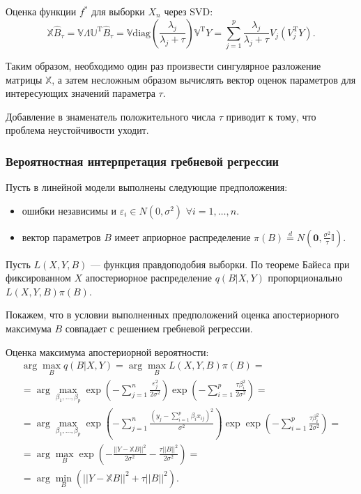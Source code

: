 \documentclass[11pt,colorlinks=true]{article}
\DeclareMathOperator{\T}{T}
\begin{document}
 Оценка функции $f^{\ast}$ для выборки $X_{n}$ через SVD:
\begin{equation*}
\mathbb{X}\hat{B}_{\tau} = \mathbb{V}\mathbb{\Lambda}\mathbb{U}^{\T}\hat{B}_{\tau} = \mathbb{V} \mathrm{diag}\left(\frac{\lambda_j}{\lambda_j + \tau}\right)\mathbb{V}^{\T}Y = \sum_{j=1}^p \frac{\lambda_j}{\lambda_j + \tau} V_j(V_j^{\T}Y).
\end{equation*}

 Таким образом, необходимо один раз произвести сингулярное разложение матрицы $\mathbb{X}$, а затем несложным образом вычислять вектор оценок параметров для интересующих значений параметра $\tau$. 

Добавление в знаменатель положительного числа $\tau$ приводит к тому, что проблема неустойчивости уходит. 

\subsubsection{Вероятностная интерпретация гребневой регрессии}

Пусть в линейной модели выполнены следующие предположения:
\begin{itemize}
\item ошибки независимы и $\varepsilon_{i}\in N(0,\sigma^{2})$ $\forall i=1,\ldots,n$.
\item вектор параметров $B$ имеет априорное распределение $\pi(B)\stackrel{d}{=}N(\bm{0},\frac{\sigma^{2}}{\tau}\mathbb{I})$.
\end{itemize}

 Пусть $L(X,Y,B)$ --- функция правдоподобия выборки. 
 По теореме Байеса при фиксированном $X$ апостериорное распределение $q(B|X,Y)$ пропорционально $L(X,Y,B)\pi(B)$.

Покажем, что в условии выполненных предположений оценка апостериорного максимума $B$ совпадает с решением гребневой регрессии.

Оценка максимума апостериорной вероятности:
\begin{multline*}
\arg\max_{B}q(B|X,Y)
=
\arg\max_{B}L(X,Y,B)\pi(B)
=\\=
\arg\max_{\beta_{1},\ldots,\beta_{p}}\exp
\left(
-\sum_{j=1}^{n}
\frac{\varepsilon_{j}^{2}}{2\sigma^{2}}
\right)
\exp\left(
-\sum_{i=1}^{p}
\frac{\tau\beta_{i}^{2}}{2\sigma^{2}}\right)
=\\=
\arg\max_{\beta_{1},\ldots,\beta_{p}}\exp
\left(-\sum_{j=1}^{n}
\frac{(y_{j}-\sum_{i=1}^{p}\beta_{i}x_{ij})^{2}}{\sigma^{2}}
\right)
\exp
\exp\left(
-\sum_{i=1}^{p}
\frac{\tau\beta_{i}^{2}}{2\sigma^{2}}\right)
=\\=
\arg\max_{B}
\exp
\left(
-\frac{||Y-\mathbb{X}B||^{2}}{2\sigma^{2}}-\frac{\tau||B||^{2}}{2\sigma^{2}}
\right)
=\\=
\arg\min_{B}
(||Y-\mathbb{X}B||^{2}+\tau||B||^{2}).
\end{multline*}
\end{document}

